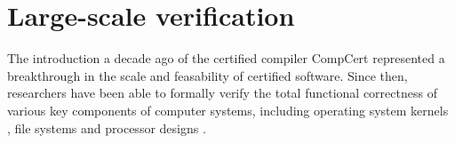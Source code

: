 \documentclass[draft,11pt]{report}
\newcommand{\refby}{\preceq}     %
\begin{document}


%
%
%


\section{Large-scale verification} %

The introduction a decade ago of
the certified compiler CompCert \cite{compcert}
represented a breakthrough
in the scale and feasability of
certified software.
Since then,
researchers have been able to formally verify the
total functional correctness
of various key components of computer systems,
including
operating system kernels \cite{sel4,popl15},
file systems \cite{fscq} and
processor designs \cite{safe,kami}.
\end{document}
